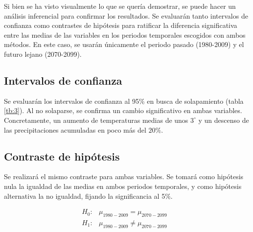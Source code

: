 \documentclass[9pt,twocolumn,twoside]{opticajnl}
\begin{document}
Si bien se ha visto visualmente lo que se quería demostrar, se puede hacer un análisis inferencial para confirmar los resultados. Se evaluarán tanto intervalos de confianza como contrastes de hipótesis para ratificar la diferencia significativa entre las medias de las variables en los periodos temporales escogidos con ambos métodos. En este caso, se usarán únicamente el periodo pasado (1980-2009) y el futuro lejano (2070-2099).

\subsection{Intervalos de confianza}

Se evaluarán los intervalos de confianza al 95\% en busca de solapamiento (tabla \ref{tb:3}). Al no solaparse, se confirma un cambio significativo en ambas variables. Concretamente, un aumento de temperaturas medias de unos $3^\circ$ y un descenso de las precipitaciones acumuladas en poco más del $20\%$.

\begin{table}[H]
\centering
{}
\caption{Salida de código: intervalos de confianza al 95\% para temperatura y precipitación.}
\label{tb:3}
\end{table}

\subsection{Contraste de hipótesis}

Se realizará el mismo contraste para ambas variables. Se tomará como hipótesis nula la igualdad de las medias en ambos periodos temporales, y como hipótesis alternativa la no igualdad, fijando la significancia al 5\%. 

\begin{equation}
\begin{matrix}
H_0: & \mu_{1980-2009} = \mu_{2070-2099} & \\
H_1: & \mu_{1980-2009} \neq \mu_{2070-2099} &
\end{matrix}
\end{equation}
\end{document}
